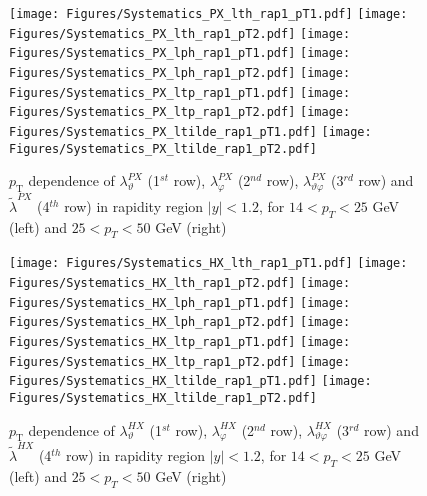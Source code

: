 \documentclass[12pt]{article}
\newcommand{\pT}{p_\mathrm{T}}
\newcommand{\absy}{\left |  y \right |}
\newcommand{\lamthHX}{\lambda^{\scriptscriptstyle HX}_\vartheta}
\newcommand{\lamphHX}{\lambda^{\scriptscriptstyle HX}_\varphi}
\newcommand{\lamthphHX}{\lambda^{\scriptscriptstyle HX}_{\vartheta \varphi}}
\newcommand{\lamtildeHX}{\tilde{\lambda}^{\scriptscriptstyle HX}}
\newcommand{\lamthPX}{\lambda^{\scriptscriptstyle PX}_\vartheta}
\newcommand{\lamphPX}{\lambda^{\scriptscriptstyle PX}_\varphi}
\newcommand{\lamthphPX}{\lambda^{\scriptscriptstyle PX}_{\vartheta \varphi}}
\newcommand{\lamtildePX}{\tilde{\lambda}^{\scriptscriptstyle PX}}
\begin{document}



\begin{figure}[htbp]
\centering
\texttt{[image: Figures/Systematics\_PX\_lth\_rap1\_pT1.pdf]}
\texttt{[image: Figures/Systematics\_PX\_lth\_rap1\_pT2.pdf]}
\texttt{[image: Figures/Systematics\_PX\_lph\_rap1\_pT1.pdf]}
\texttt{[image: Figures/Systematics\_PX\_lph\_rap1\_pT2.pdf]}
\texttt{[image: Figures/Systematics\_PX\_ltp\_rap1\_pT1.pdf]}
\texttt{[image: Figures/Systematics\_PX\_ltp\_rap1\_pT2.pdf]}
\texttt{[image: Figures/Systematics\_PX\_ltilde\_rap1\_pT1.pdf]}
\texttt{[image: Figures/Systematics\_PX\_ltilde\_rap1\_pT2.pdf]}
\caption{$\pT$ dependence of $\lamthPX$
(1$^{st}$ row), $\lamphPX$ (2$^{nd}$ row), $\lamthphPX$ (3$^{rd}$ row) and 
$\lamtildePX$ (4$^{th}$ row) in rapidity region $\absy<1.2$, for $14 < p_T < 25$ GeV (left) and
$25 < p_T < 50$ GeV (right)}
\end{figure}
\clearpage







\begin{figure}[htbp]
\centering
\texttt{[image: Figures/Systematics\_HX\_lth\_rap1\_pT1.pdf]}
\texttt{[image: Figures/Systematics\_HX\_lth\_rap1\_pT2.pdf]}
\texttt{[image: Figures/Systematics\_HX\_lph\_rap1\_pT1.pdf]}
\texttt{[image: Figures/Systematics\_HX\_lph\_rap1\_pT2.pdf]}
\texttt{[image: Figures/Systematics\_HX\_ltp\_rap1\_pT1.pdf]}
\texttt{[image: Figures/Systematics\_HX\_ltp\_rap1\_pT2.pdf]}
\texttt{[image: Figures/Systematics\_HX\_ltilde\_rap1\_pT1.pdf]}
\texttt{[image: Figures/Systematics\_HX\_ltilde\_rap1\_pT2.pdf]}
\caption{$\pT$ dependence of $\lamthHX$
(1$^{st}$ row), $\lamphHX$ (2$^{nd}$ row), $\lamthphHX$ (3$^{rd}$ row) and 
$\lamtildeHX$ (4$^{th}$ row) in rapidity region $\absy<1.2$, for $14 < p_T < 25$ GeV (left) and
$25 < p_T < 50$ GeV (right)}
\end{figure}
\clearpage



\end{document}
